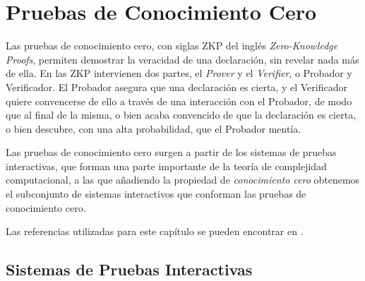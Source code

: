 
\chapter{Pruebas de Conocimiento Cero}\label{ch:zkp} 




%

Las pruebas de conocimiento cero, con siglas ZKP del inglés \textit{Zero-Knowledge Proofs}, permiten demostrar la veracidad de una declaración, sin revelar nada más de ella. En las ZKP intervienen dos partes, el \textit{Prover} y el \textit{Verifier}, o Probador y Verificador. El Probador asegura que una declaración es cierta, y el Verificador quiere convencerse de ello a través de una interacción con el Probador, de modo que al final de la misma, o bien acaba convencido de que la declaración es cierta, o bien descubre, con una alta probabilidad, que el Probador mentía.

Las pruebas de conocimiento cero surgen a partir de los sistemas de pruebas interactivas, que forman una parte importante de la teoría de complejidad computacional, a las que añadiendo la propiedad de \textit{conocimiento cero} obtenemos el subconjunto de sistemas interactivos que conforman las pruebas de conocimiento cero.

Las referencias utilizadas para este capítulo se pueden encontrar en \citep{pieprzyk2013fundamentals, rosen2007discrete, blum, damgardcommitment, Pardo, menezes1996handbook, stinson2005cryptography}.


\section{Sistemas de Pruebas Interactivas}

